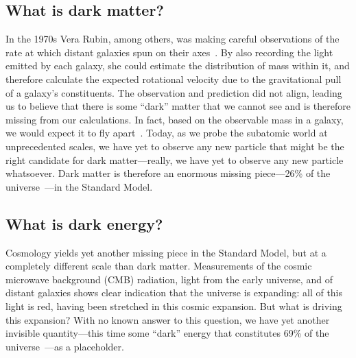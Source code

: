 \subsection{What is dark matter?}
In the 1970s Vera Rubin, among others, was making careful observations of the rate at which distant galaxies spun on their axes~\cite{VeraRubin}.  
By also recording the light emitted by each galaxy, she could estimate the distribution of mass within it, and therefore calculate the expected rotational velocity due to the gravitational pull of a galaxy's constituents. 
The observation and prediction did not align, leading us to believe that there is some ``dark'' matter that we cannot see and is therefore missing from our calculations. 
In fact, based on the observable mass in a galaxy, we would expect it to fly apart~\cite{GalaxyDM}. 
Today, as we probe the subatomic world at unprecedented scales, we have yet to observe any new particle that might be the right candidate for dark matter---really, we have yet to observe any new particle whatsoever. 
Dark matter is therefore an enormous missing piece---26\% of the universe~\cite{PlanckDM}---in the Standard Model.

\subsection{What is dark energy?}
Cosmology yields yet another missing piece in the Standard Model, but at a completely different scale than dark matter. 
Measurements of the cosmic microwave background (CMB) radiation, light from the early universe, and of distant galaxies shows clear indication that the universe is expanding: all of this light is red, having been stretched in this cosmic expansion. %
But what is driving this expansion? 
With no known answer to this question, we have yet another invisible quantity---this time some ``dark'' energy that constitutes 69\% of the universe~\cite{PlanckDM}---as a placeholder.

